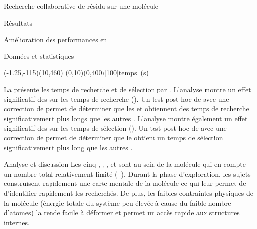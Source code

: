 \documentclass[myfrancais]{mythesis}
\begin{document}
\begin{mychapter}{Recherche collaborative de résidu sur une molécule}
\begin{mysection}{Résultats}
\begin{mysubsection}{Amélioration des performances en }
\begin{mysubsubsection}{Données et statistiques}
					\begin{myfigure}
						\begin{myps}(-1.25,-115)(10,460)
							\myaxes(0,10){}(0,400)[100]{temps~(s)}
						\end{myps}
					\end{myfigure}

					La  présente les temps de recherche et de sélection par  .
					L'analyse montre un effet significatif des   sur les temps de recherche ().
					Un test post-hoc de  avec une correction de  permet de déterminer que les   et  obtiennent des temps de recherche significativement plus longs que les autres .
					L'analyse montre également un effet significatif des   sur les temps de sélection ().
					Un test post-hoc de  avec une correction de  permet de déterminer que le   obtient un temps de sélection significativement plus long que les autres .
				\end{mysubsubsection}
				\begin{mysubsubsection}{Analyse et discussion}
					Les cinq  , , ,  et  sont au sein de la molécule \myTRPCAGE qui en compte un nombre total relativement limité (~).
					Durant la phase d'exploration, les sujets construisent rapidement une carte mentale de la molécule ce qui leur permet de d'identifier rapidement les  recherchés.
					De plus, les faibles contraintes physiques de la molécule (énergie totale du système peu élevée à cause du faible nombre d'atomes) la rende facile à déformer et permet un accès rapide aux structures internes.

\end{mysubsubsection}
\end{mysubsection}
\end{mysection}
\end{mychapter}
\end{document}
